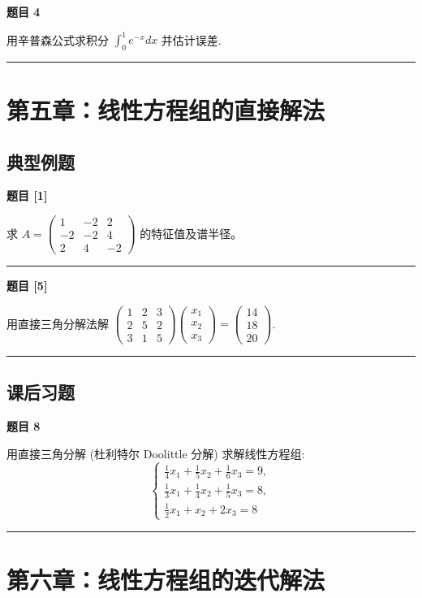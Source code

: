 \documentclass[a4paper,12pt]{ctexart}
\newcommand{\problem}[1]{
    \par\noindent\textbf{题目 #1} \quad
}
\newcommand{\workspace}[1][5cm]{
    \par
    \vspace{#1}
    \noindent\rule{\textwidth}{0.1pt} %
    \vspace{0.5em}
    \par
}
\begin{document}
\problem{4}
用辛普森公式求积分 $\int_0^1 e^{-x} dx$ 并估计误差.
\workspace[6cm]

\newpage

\section{第五章：线性方程组的直接解法}

\subsection*{典型例题}

\problem{[1]}
求 $A = \begin{pmatrix} 1 & -2 & 2 \\ -2 & -2 & 4 \\ 2 & 4 & -2 \end{pmatrix}$ 的特征值及谱半径。
\workspace[6cm]

\problem{[5]}
用直接三角分解法解
$\begin{pmatrix} 1 & 2 & 3 \\ 2 & 5 & 2 \\ 3 & 1 & 5 \end{pmatrix} \begin{pmatrix} x_1 \\ x_2 \\ x_3 \end{pmatrix} = \begin{pmatrix} 14 \\ 18 \\ 20 \end{pmatrix}$.
\workspace[8cm]

\subsection*{课后习题}

\problem{8}
用直接三角分解 (杜利特尔 Doolittle 分解) 求解线性方程组:
\[
\begin{cases}
\frac{1}{4}x_1 + \frac{1}{5}x_2 + \frac{1}{6}x_3 = 9, \\
\frac{1}{3}x_1 + \frac{1}{4}x_2 + \frac{1}{5}x_3 = 8, \\
\frac{1}{2}x_1 + x_2 + 2x_3 = 8
\end{cases}
\]
\workspace[8cm]

\newpage

\section{第六章：线性方程组的迭代解法}
\end{document}
